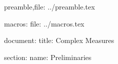 
preamble,file:
    ../preamble.tex

macros:
    file:
        ../macros.tex
    
    \newcommand{\A}[0] { \mathcal{A} }
    \newcommand{\B}[0] { \mathcal{B} }
    \newcommand{\C}[0] { \mathcal{C} }
    \newcommand{\D}[0] { \mathcal{D} }
    \newcommand{\E}[0] { \mathcal{E} }
    \newcommand{\F}[0] { \mathcal{F} }
    \newcommand{\G}[0] { \mathcal{G} }
    \newcommand{\M}[0] { \mathcal{M} }
    \newcommand{\cS}[0] { \mathcal{S} }
    \newcommand{\U}[0] { \mathcal{U} }
    \newcommand{\V}[0] { \mathcal{V} }
    \newcommand{\W}[0] { \mathcal{W} }
    \newcommand{\Bl}[0] { \mathcal{B} \ell }
    \newcommand{\Ell}[0] { \mathcal{L} }       


document:
    title:
        Complex Measures

    section:
        name:
            Preliminaries









